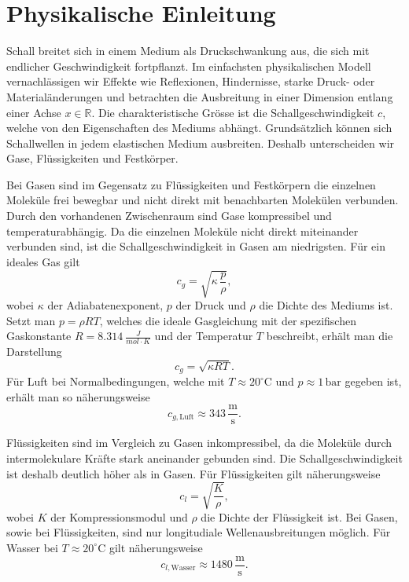 %
%
%
%
\section{Physikalische Einleitung\label{schall:section:teil0}}

Schall breitet sich in einem Medium als Druckschwankung aus, die sich
mit endlicher Geschwindigkeit fortpflanzt.
Im einfachsten physikalischen Modell vernachlässigen wir Effekte wie
Reflexionen, Hindernisse, starke Druck- oder Materialänderungen und
betrachten die Ausbreitung in einer Dimension entlang einer Achse
$x \in \mathbb{R}$.
Die charakteristische Grösse ist die Schallgeschwindigkeit $c$, welche
von den Eigenschaften des Mediums abhängt.
Grundsätzlich können sich Schallwellen in jedem elastischen Medium ausbreiten.
Deshalb unterscheiden wir Gase, Flüssigkeiten und Festkörper.

Bei Gasen sind im Gegensatz zu Flüssigkeiten und Festkörpern die
einzelnen Moleküle frei bewegbar und nicht direkt mit
benachbarten Molekülen verbunden.
Durch den vorhandenen Zwischenraum sind Gase kompressibel und
temperaturabhängig.
Da die einzelnen Moleküle nicht direkt miteinander verbunden sind,
ist die Schallgeschwindigkeit in Gasen am niedrigsten.
Für ein ideales Gas gilt
\begin{equation*}
    c_{g} = \!\sqrt{\kappa \, \frac{p}{\rho}},
\end{equation*}
wobei $\kappa$ der Adiabatenexponent, $p$ der Druck und $\rho$ die
Dichte des Mediums ist.
Setzt man $p = \rho R T$, welches die ideale Gasgleichung mit der
spezifischen Gaskonstante $R = \SI{8.314}{\frac{J}{mol \cdot K}}$
und der Temperatur $T$ beschreibt, erhält man die Darstellung
\begin{equation*}
    c_{g} = \!\sqrt{\kappa R T}.
    \label{eq:c-ideal-gas}
\end{equation*}
Für Luft bei Normalbedingungen, welche mit
$T \approx 20^\circ \mathrm{C}$ und $p \approx 1\,\mathrm{bar}$
gegeben ist, erhält man so näherungsweise
\begin{equation*}
    c_{g,\text{Luft}} \approx 343 \,\frac{\mathrm{m}}{\mathrm{s}}.
\end{equation*}

Flüssigkeiten sind im Vergleich zu Gasen inkompressibel, da die
Moleküle durch intermolekulare Kräfte stark aneinander gebunden sind.
Die Schallgeschwindigkeit ist deshalb deutlich höher als in Gasen.
Für Flüssigkeiten gilt näherungsweise
\begin{equation}
    c_{l} = \!\sqrt{\frac{K}{\rho}},
    \label{eq:c-liquid}
\end{equation}
wobei $K$ der Kompressionsmodul und $\rho$ die Dichte der Flüssigkeit ist.
Bei Gasen, sowie bei Flüssigkeiten, sind nur longitudiale
Wellenausbreitungen möglich.
Für Wasser bei $T \approx 20^\circ \mathrm{C}$ gilt näherungsweise
\begin{equation*}
    c_{l,\text{Wasser}} \approx 1480 \,\frac{\mathrm{m}}{\mathrm{s}}.
\end{equation*}


